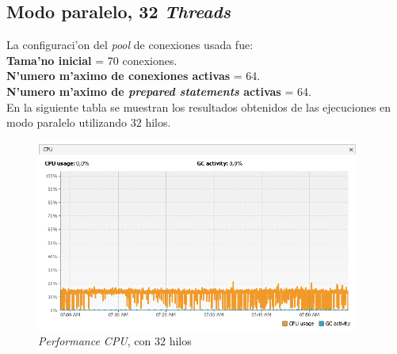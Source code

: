 \subsection{Modo paralelo, 32 \emph{Threads}}
\noindent
La configuraci'on del \emph{pool} de conexiones usada fue: \\

\textbf{Tama'no inicial} = 70 conexiones. \\
\textbf{N'umero m'aximo de conexiones activas} = 64. \\
\textbf{N'umero m'aximo de \emph{prepared statements} activas} = 64. \\

En la siguiente tabla se muestran los resultados obtenidos de las ejecuciones en modo paralelo utilizando 32 hilos. \\

\begin{table}[H]
\begin{center}
\end{center}
\caption{Resultados en modo paralelo con 32 hilos}
\end{table}

\begin{figure}[H]
\centering
\includegraphics[width=0.95\textwidth]{images/Performance_CPU_32_Threads}
\caption{\emph{Performance CPU}, con 32 hilos}
\label{fig:6.28}
\end{figure}

